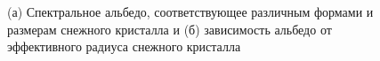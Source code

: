 \documentclass[a4paper, fontsize=14pt]{scrartcl}
\begin{document}
\begin{figure}[h]
    \begin{minipage}[h]{0.5\linewidth}
    \end{minipage}
    \hfill
    \begin{minipage}[h]{0.5\linewidth}
    \end{minipage}
    \caption{(а) Спектральное альбедо, соответствующее различным формами и размерам снежного кристалла и (б) зависимость альбедо от эффективного радиуса снежного кристалла}
    \label{fig:image}
\end{figure}
\end{document}
